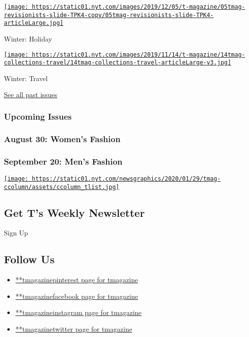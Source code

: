 \href{https://www.nytimes.com/issue/t-magazine/2019/11/21/ts-dec-8-holiday-issue}{\texttt{[image: https://static01.nyt.com/images/2019/12/05/t-magazine/05tmag-revisionists-slide-TPK4-copy/05tmag-revisionists-slide-TPK4-articleLarge.jpg]}}

Winter: Holiday

\href{https://www.nytimes.com/issue/t-magazine/2019/11/04/ts-nov-17-travel-issue}{\texttt{[image: https://static01.nyt.com/images/2019/11/14/t-magazine/14tmag-collections-travel/14tmag-collections-travel-articleLarge-v3.jpg]}}

Winter: Travel

\href{https://www.nytimes.com/interactive/2020/t-magazine/past-issues.html}{See
all past issues}

\hypertarget{upcoming-issues}{%
\subsubsection{Upcoming Issues}\label{upcoming-issues}}

\hypertarget{august-30-womens-fashion}{%
\subsubsection{August 30: Women's
Fashion}\label{august-30-womens-fashion}}

\hypertarget{september-20-mens-fashion}{%
\subsubsection{September 20: Men's
Fashion}\label{september-20-mens-fashion}}

\href{https://www.nytimes.com/newsletters/t-list}{\texttt{[image: https://static01.nyt.com/newsgraphics/2020/01/29/tmag-ccolumn/assets/ccolumn\_tlist.jpg]}}

\hypertarget{get-ts-weekly-newsletter}{%
\subsection{Get T's Weekly Newsletter}\label{get-ts-weekly-newsletter}}

Sign Up

\hypertarget{follow-us}{%
\subsection{Follow Us}\label{follow-us}}

\begin{itemize}
\tightlist
\item
  \href{https://pinterest.com/tmagazine}{**tmagazinepinterest page for
  tmagazine}
\item
  \href{https://www.facebook.com/tmagazine}{**tmagazinefacebook page for
  tmagazine}
\item
  \href{https://instagram.com/tmagazine}{**tmagazineinstagram page for
  tmagazine}
\item
  \href{https://twitter.com/tmagazine}{**tmagazinetwitter page for
  tmagazine}
\end{itemize}

